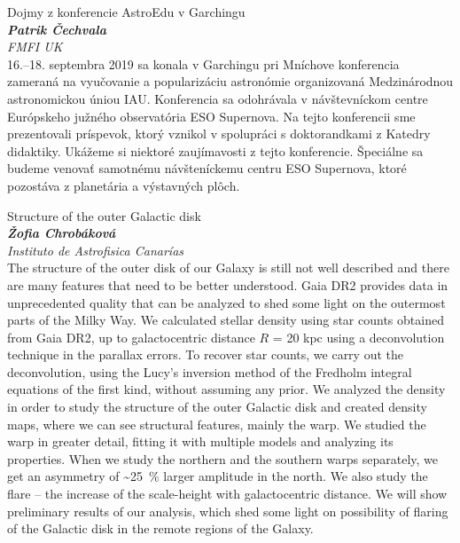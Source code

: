 \documentclass[a4paper]{report}
\begin{document}
                    \begin{tcolorbox}[
                                    colback=white,
                    colframe=black!70!white,
                                fonttitle=\Large\bfseries,
                title=11:00
            ]
                {\Large Dojmy z konferencie AstroEdu v Garchingu}
                                                            \\ \textbf{\textit{Patrik Čechvala}}
                                        \\ \textit{FMFI UK}                                \\[2ex]16.--18. septembra 2019 sa konala v Garchingu pri Mníchove konferencia zameraná na vyučovanie a popularizáciu astronómie organizovaná Medzinárodnou astronomickou úniou IAU. Konferencia sa odohrávala v návštevníckom centre Európskeho južného observatória ESO Supernova. Na tejto konferencii sme prezentovali príspevok, ktorý vznikol v spolupráci s doktorandkami z Katedry didaktiky. Ukážeme si niektoré zaujímavosti z tejto konferencie. Špeciálne sa budeme venovať samotnému návšteníckemu centru ESO Supernova, ktoré pozostáva z planetária a výstavných plôch.
            \end{tcolorbox}
                    \begin{tcolorbox}[
                                    colback=white,
                    colframe=black!70!white,
                                fonttitle=\Large\bfseries,
                title=11:45
            ]
                {\Large Structure of the outer Galactic disk}
                                                            \\ \textbf{\textit{Žofia Chrobáková}}
                                        \\ \textit{Instituto de Astrofisica Canarías}                                \\[2ex]The structure of the outer disk of our Galaxy is still not well described and there are many features that need to be better understood. Gaia DR2 provides data in unprecedented quality that can be analyzed to shed some light on the outermost parts of the Milky Way. We calculated stellar density using star counts obtained from Gaia DR2, up to galactocentric distance $R$ = 20 kpc using a deconvolution technique in the parallax errors. To recover star counts, we carry out the deconvolution, using the Lucy's inversion method of the Fredholm integral equations of the first kind, without assuming any prior. We analyzed the density in order to study the structure of the outer Galactic disk and created density maps, where we can see structural features, mainly the warp. We studied the warp in greater detail, fitting it with multiple models and analyzing its properties. When we study the northern and the southern warps separately, we get an asymmetry of \textasciitilde\SI{25}{\percent} larger amplitude in the north. We also study the flare -- the increase of the scale-height with galactocentric distance. We will show preliminary results of our analysis, which shed some light on possibility of flaring of the Galactic disk in the remote regions of the Galaxy.
            \end{tcolorbox}
\end{document}
